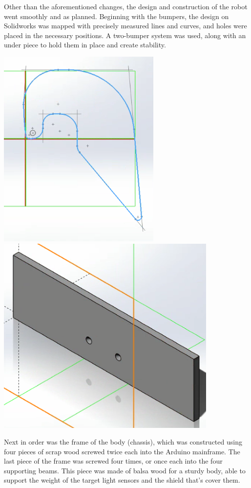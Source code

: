 \documentclass{article}
\begin{document}
	Other than the aforementioned changes, the design and construction of the robot went smoothly and as planned. Beginning with the bumpers, the design on Solidworks was mapped with precisely measured lines and curves, and holes were placed in the necessary positions. A two-bumper system was used, along with an under piece to hold them in place and create stability.  \\
	
	\begin{center}
	\includegraphics[height=10cm]{Bumpers.png}
	\includegraphics[height=10cm]{BumperSupport.png}
	\end{center}
	
	Next in order was the frame of the body (chassis), which was constructed using four pieces of scrap wood screwed twice each into the Arduino mainframe. The last piece of the frame was screwed four times, or once each into the four supporting beams. This piece was made of balsa wood for a sturdy body, able to support the weight of the target light sensors and the shield that’s cover them. \\
	
\end{document}
